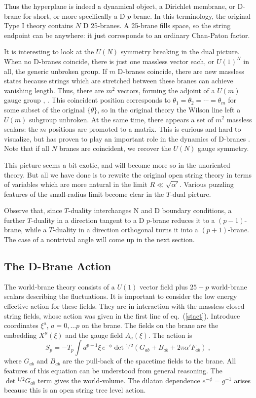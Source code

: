 \documentclass[12pt]{article}
\def\be{\begin{equation}}
\def\ee{\end{equation}}
\def\ap{\alpha'}
\begin{document}
Thus the hyperplane is indeed a dynamical object, a
Dirichlet membrane, or D-brane for short, or more specifically a D
$p$-brane.  In this terminology, the original Type I theory contains $N$
D 25-branes. A 25-brane fills space, so the string endpoint can be anywhere:
it just corresponds to an ordinary Chan-Paton factor.

It is interesting to look at the $U(N)$ symmetry breaking in the dual
picture.  When no D-branes coincide, there is just one massless vector
each, or $U(1)^N$ in all, the generic unbroken group.  If $m$
D-branes coincide, there are new massless states because
strings which are stretched between these branes
can achieve vanishing length.  Thus, there are $m^2$ vectors, forming
the adjoint of a $U(m)$ gauge group \cite{joecomb}, \cite{witbound}.
This coincident position corresponds to 
$\theta_1=\theta_2=\cdots=\theta_m$ for some subset of the original
$\{\theta\}$, so in the original theory the Wilson line left a $U(m)$
subgroup unbroken. At the same time, there
appears a set of $m^2$ massless scalars: the $m$ positions are promoted
to a matrix.  This is curious and hard to visualize, but has proven to play
an important role in the dynamics of
D-branes \cite{witbound}. Note that if all $N$
branes are coincident, we recover the $U(N)$ gauge symmetry.

This picture seems a bit exotic, and will become more so in the unoriented
theory.  But all we have done is to rewrite the original open string theory
in terms of variables which are more natural in the limit $R \ll
\sqrt{\ap}$.  Various puzzling features of the small-radius limit become
clear in the $T$-dual picture.

Observe that, since $T$-duality interchanges N and D boundary conditions, a
further $T$-duality in a direction tangent to a D $p$-brane reduces it to a
$(p-1)$-brane, while a $T$-duality in a direction orthogonal turns it into a
$(p+1)$-brane.  The case of a nontrivial angle will come up in the next
section.

\subsection{The D-Brane Action}

The world-brane
theory consists of a $U(1)$ vector field plus
$25-p$ world-brane scalars describing the fluctuations.  It is important to
consider the low energy effective action for these fields.
They are in
interaction with the massless closed string fields, whose action was given
in the first line of eq.~(\ref{stact}).
Introduce coordinates $\xi^a$, $a = 0, \ldots p$ on the brane.  The
fields on the brane are the embedding $X^\mu(\xi)$ and the gauge field
$A_a(\xi)$.  The action is \cite{leigh}
\be
S_p = -T_p \int d^{p+1}\xi\, e^{-\phi} \det\!^{1/2}\left(G_{ab} + B_{ab}
+ 2\pi\ap F_{ab}\right)\ , \label{dact}
\ee
where $G_{ab}$ and $B_{ab}$ are the pull-back of the spacetime fields to
the brane.  All features of this equation can be understood from general
reasoning.  The $\det\!^{1/2} G_{ab}$ term gives the world-volume. The
dilaton dependence $e^{-\phi} = g^{-1}$ arises because this is an open
string tree level action.
\end{document}
